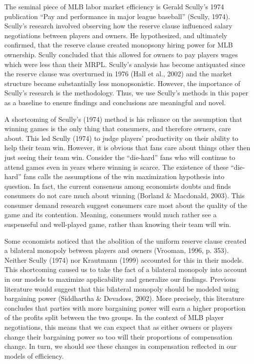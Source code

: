 \documentclass[
  12pt,
  letterpaper,
  DIV=11,
  numbers=noendperiod]{scrartcl}
\begin{document}
The seminal piece of MLB labor market efficiency is Gerald Scully's 1974
publication ``Pay and performance in major league baseball'' (Scully,
1974). Scully's research involved observing how the reserve clause
influenced salary negotiations between players and owners. He
hypothesized, and ultimately confirmed, that the reserve clause created
monopsony hiring power for MLB ownership. Scully concluded that this
allowed for owners to pay players wages which were less than their MRPL.
Scully's analysis has become antiquated since the reserve clause was
overturned in 1976 (Hall et al., 2002) and the market structure became
substantially less monopsonistic. However, the importance of Scully's
research is the methodology. Thus, we use Scully's methods in this paper
as a baseline to ensure findings and conclusions are meaningful and
novel.

A shortcoming of Scully's (1974) method is his reliance on the
assumption that winning games is the only thing that consumers, and
therefore owners, care about. This led Scully (1974) to judge players'
productivity on their ability to help their team win. However, it is
obvious that fans care about things other then just seeing their team
win. Consider the ``die-hard'' fans who will continue to attend games
even in years where winning is scarce. The existence of these
``die-hard'' fans calls the assumptions of the win maximization
hypothesis into question. In fact, the current consensus among
economists doubts and finds consumers do not care much about winning
(Borland \& Macdonald, 2003). This consumer demand research suggest
consumers care most about the quality of the game and its contention.
Meaning, consumers would much rather see a suspenseful and well-played
game, rather than knowing their team will win.

Some economists noticed that the abolition of the uniform reserve clause
created a bilateral monopoly between players and owners (Vrooman, 1996,
p. 353). Neither Scully (1974) nor Krautmann (1999) accounted for this
in their models. This shortcoming caused us to take the fact of a
bilateral monopoly into account in our models to maximize applicability
and generalize our findings. Previous literature would suggest that this
bilateral monopoly should be modeled using bargaining power (Siddhartha
\& Devadoss, 2002). More precisely, this literature concludes that
parties with more bargaining power will earn a higher proportion of the
profits split between the two groups. In the context of MLB player
negotiations, this means that we can expect that as either owners or
players change their bargaining power so too will their proportions of
compensation change. In turn, we should see these changes in
compensation reflected in our models of efficiency.
\end{document}
